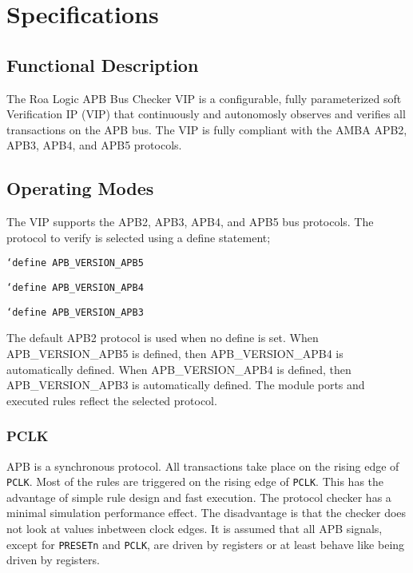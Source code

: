 \chapter{Specifications} \label{specifications}

\section{Functional Description}\label{functional-description}

The Roa Logic APB Bus Checker VIP is a configurable, fully parameterized soft Verification IP (VIP)
that continuously and autonomosly observes and verifies all transactions on the APB bus.
The VIP is fully compliant with the AMBA APB2, APB3, APB4, and APB5 protocols.


\section{Operating Modes}\label{operating-modes}

The VIP supports the APB2, APB3, APB4, and APB5 bus protocols. The protocol to verify is selected using a define statement;

\texttt{`define APB\_VERSION\_APB5}

\texttt{`define APB\_VERSION\_APB4}

\texttt{`define APB\_VERSION\_APB3}

The default APB2 protocol is used when no define is set. When APB\_VERSION\_APB5 is defined, then APB\_VERSION\_APB4 is automatically defined. When APB\_VERSION\_APB4 is defined, then APB\_VERSION\_APB3 is automatically defined.
The module ports and executed rules reflect the selected protocol.
 

\subsection{PCLK}\label{PCLK}
APB is a synchronous protocol. All transactions take place on the rising edge of \texttt{PCLK}.
Most of the rules are triggered on the rising edge of \texttt{PCLK}. This has the advantage of simple rule design and fast execution. The protocol checker has a minimal simulation performance effect. The disadvantage is that the checker does not look at values inbetween clock edges. It is assumed that all APB signals, except for \texttt{PRESETn} and \texttt{PCLK}, are driven by registers or at least behave like being driven by registers.
